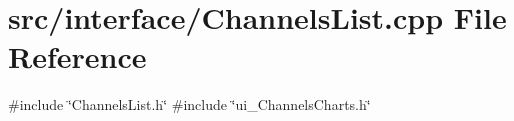 \section{src/interface/\+Channels\+List.cpp File Reference}
\label{_channels_list_8cpp}
{\ttfamily \#include \char`\"{}Channels\+List.\+h\char`\"{}}\newline
{\ttfamily \#include \char`\"{}ui\+\_\+\+Channels\+Charts.\+h\char`\"{}}\newline
